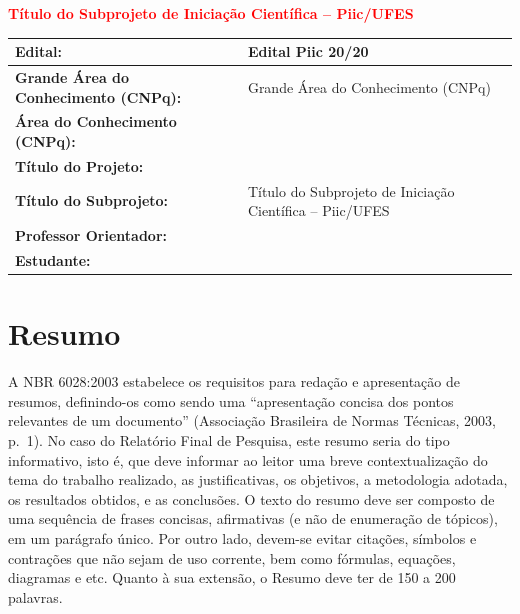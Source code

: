 \documentclass[10pt,a4paper]{article}
\newcommand{\grandeArea}{Grande Área do Conhecimento (CNPq)}
\newcommand{\tituloSubprojeto}{Título do Subprojeto de Iniciação Científica -- Piic/UFES}
\newcommand{\edital}{Edital Piic 20\underline{\hspace{0.6cm}}/20\underline{\hspace{0.6cm}}}
\newcommand{\areaConhecimento}{}
\newcommand{\tituloProjeto}{}
\newcommand{\orientador}{}
\newcommand{\estudante}{}
\newcommand{\placeholderColor}{red}
\begin{document}
\begin{center}
  {\fontsize{14}{17}\selectfont\bfseries\textcolor{\placeholderColor}{\tituloSubprojeto}\par}
\end{center}
\vspace{4pt}

\begin{table}[h!]
  \centering\singlespacing
  \begin{tabularx}{\textwidth}{|>{\bfseries}p{}|L|}
    \hline
    Edital: & \textbf{\edital} \\ \hline
    Grande Área do Conhecimento (CNPq): & \grandeArea \\ \hline
    Área do Conhecimento (CNPq): & \areaConhecimento \\ \hline
    Título do Projeto: & \tituloProjeto \\ \hline
    Título do Subprojeto: & \tituloSubprojeto \\ \hline
    Professor Orientador: & \orientador \\ \hline
    Estudante: & \estudante \\ \hline
  \end{tabularx}
\end{table}

\section*{Resumo}
A NBR 6028:2003 estabelece os requisitos para redação e apresentação de resumos, definindo-os como sendo uma ``apresentação concisa dos pontos relevantes de um documento'' (Associação Brasileira de Normas Técnicas, 2003, p.~1). No caso do Relatório Final de Pesquisa, este resumo seria do tipo informativo, isto é, que deve informar ao leitor uma breve contextualização do tema do trabalho realizado, as justificativas, os objetivos, a metodologia adotada, os resultados obtidos, e as conclusões. O texto do resumo deve ser composto de uma sequência de frases concisas, afirmativas (e não de enumeração de tópicos), em um parágrafo único. Por outro lado, devem-se evitar citações, símbolos e contrações que não sejam de uso corrente, bem como fórmulas, equações, diagramas e etc. Quanto à sua extensão, o Resumo deve ter de 150 a 200 palavras.
\end{document}
